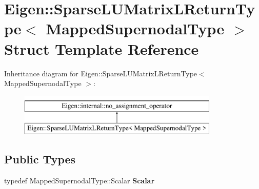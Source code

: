 \hypertarget{struct_eigen_1_1_sparse_l_u_matrix_l_return_type}{}\section{Eigen\+::Sparse\+L\+U\+Matrix\+L\+Return\+Type$<$ Mapped\+Supernodal\+Type $>$ Struct Template Reference}
\label{struct_eigen_1_1_sparse_l_u_matrix_l_return_type}
Inheritance diagram for Eigen\+::Sparse\+L\+U\+Matrix\+L\+Return\+Type$<$ Mapped\+Supernodal\+Type $>$\+:\begin{figure}[H]
\begin{center}
\leavevmode
\includegraphics[height=2.000000cm]{struct_eigen_1_1_sparse_l_u_matrix_l_return_type}
\end{center}
\end{figure}
\subsection*{Public Types}
\begin{DoxyCompactItemize}
\item 
\mbox{\label{struct_eigen_1_1_sparse_l_u_matrix_l_return_type_ae59407bc58d3ffc58a7557dbac649048}} 
typedef Mapped\+Supernodal\+Type\+::\+Scalar {\bfseries Scalar}
\end{DoxyCompactItemize}
